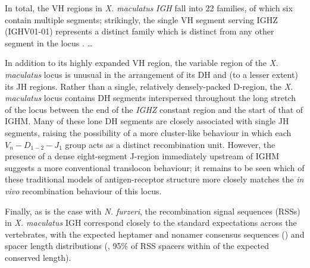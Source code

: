 	In total, the VH regions in \textit{X. maculatus} \textit{IGH} fall into 22 families, of which six contain multiple segments; strikingly, the single VH segment serving IGHZ (IGHV01-01) represents a distinct family which is distinct from any other segment in the locus . \dots %
	
	In addition to its highly expanded VH region, the variable region of the \textit{X. maculatus} locus is unusual in the arrangement of its DH and (to a lesser extent) its JH regions. Rather than a single, relatively densely-packed D-region, the \textit{X. maculatus} locus contains DH segments interspersed throughout the long stretch of the locus between the end of the \textit{IGHZ} constant region and the start of that of IGHM. Many of these lone DH segments are closely associated with single JH segments, raising the possibility of a more cluster-like behaviour in which each $V_n-D_{1-2}-J_1$ group acts as a distinct recombination unit. However, the presence of a dense eight-segment J-region immediately upstream of IGHM suggests a more conventional translocon behaviour; it remains to be seen which of these traditional models of antigen-receptor structure more closely matches the \textit{in vivo} recombination behaviour of this locus.
	
	
	Finally, as is the case with \textit{N. furzeri}, the recombination signal sequences (RSSs) in \textit{X. maculatus} IGH correspond closely to the standard expectations across the vertebrates, with the expected heptamer and nonamer consensus sequences () and spacer length distributions (, 95\% of RSS spacers within  of the expected conserved length).
	

	
